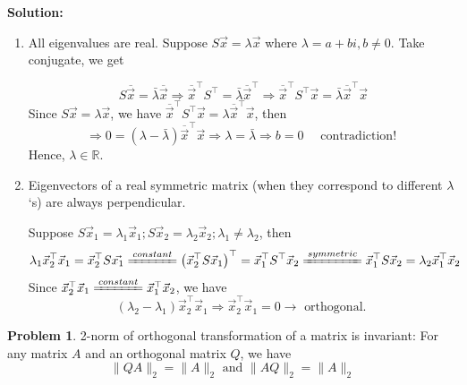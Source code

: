 \documentclass[14pt]{article}
\theoremstyle{definition}
\newtheorem{problem}[theorem]{Problem}
\newenvironment{solution}
{\color{C2}\begin{framed}\begingroup\textbf{Solution:} }
  {\endgroup\end{framed}}
\theoremstyle{remark}
\begin{document}
\begin{solution}
    \begin{enumerate}
        \item All eigenvalues are real.
              Suppose $S \vec{x}=\lambda \vec{x}$ where $\lambda=a+b i, b \neq 0$.
              Take
              conjugate, we get

              \[
                  S \overline{\vec{x}}=\bar{\lambda} \overline{\vec{x}}
                  \Rightarrow \overline{\vec{x}}^{\top} S^{\top}=\bar{\lambda} \overline{\vec{x}}^{\top}
                  \Rightarrow \overline{\vec{x}}^{\top} S^{\top} \vec{x}=\bar{\lambda} \overline{\vec{x}}^{\top} \vec{x}
              \]
              Since $S \vec{x}=\lambda \vec{x}$, we have $\overline{\vec{x}}^{\top} S^{\top} \vec{x}=\lambda \overline{\vec{x}}^{\top} \vec{x}$, then
              \[
                  \Rightarrow 0=(\lambda-\bar{\lambda})\overline{\vec{x}}^{\top} \vec{x}
                  \Rightarrow \lambda=\bar{\lambda}
                  \Rightarrow b=0 \quad \text { contradiction! }
              \]
              Hence, $\lambda \in \mathbb{R}$.
        \item Eigenvectors of a real symmetric matrix (when they correspond to different $\lambda$ `s) are always perpendicular.

              Suppose $S \vec{x}_1=\lambda_1 \vec{x}_1 ; S \vec{x}_2=\lambda_2 \vec{x}_2 ; \lambda_1 \neq \lambda_2$, then
              \[
                  \lambda_1 \vec{x}_2^{\top} \vec{x}_1 =\vec{x}_2^{\top} S \vec{x_1}
                  \xlongequal{constant} \left(\vec{x}_2^{\top} S \vec{x}_1\right)^{\top}=\vec{x}_1^{\top} S^{\top} \vec{x}_2
                  \xlongequal{symmetric}\vec{x}_1^{\top} S \vec{x}_2=\lambda_2 \vec{x}_1^{\top} \vec{x}_2
              \]
              Since $\vec{x}_2^{\top} \vec{x}_1 \xlongequal{constant} \vec{x}_1^{\top} \vec{x}_2$, we have
              \[
                  (\lambda_2-\lambda_1) \vec{x}_2^{\top} \vec{x}_1
                  \Rightarrow \vec{x}_2^{\top} \vec{x}_1=0
                  \rightarrow \text { orthogonal. }
              \]
    \end{enumerate}

\end{solution}
\begin{problem}
2-norm of orthogonal transformation of a matrix is invariant:
For any matrix $A$ and an orthogonal matrix $Q$, we have
$$
    \|Q A\|_2=\|A\|_2 \text{ and } \|AQ\|_2=\|A\|_2
$$
\end{problem}
\end{document}
